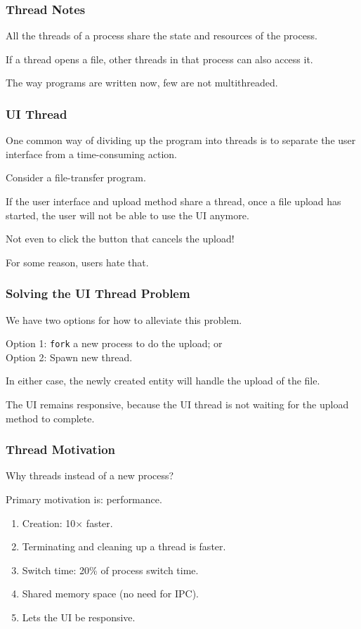 \begin{frame}
\frametitle{Thread Notes}

All the threads of a process share the state and resources of the process. 

If a thread opens a file, other threads in that process can also access it.

The way programs are written now, few are not multithreaded.



\end{frame}

\begin{frame}
\frametitle{UI Thread}

One common way of dividing up the program into threads is to separate the user interface from a time-consuming action. 

Consider a file-transfer program. 

If the user interface and upload method share a thread, once a file upload has started, the user will not be able to use the UI anymore.

Not even to click the button that cancels the upload! 

For some reason, users hate that. 

\end{frame}

\begin{frame}
\frametitle{Solving the UI Thread Problem}

We have two options for how to alleviate this problem.

Option 1: \texttt{fork} a new process to do the upload; or \\
Option 2: Spawn  new thread. 

In either case, the newly created entity will handle the upload of the file. 

The UI remains responsive, because the UI thread is not waiting for the upload method to complete.

\end{frame}

\begin{frame}
\frametitle{Thread Motivation}
Why threads instead of a new process?

Primary motivation is: performance.

\begin{enumerate}
	\item Creation: 10$\times$ faster.
	\item Terminating and cleaning up a thread is faster.
	\item Switch time: 20\% of process switch time.
	\item Shared memory space (no need for IPC).
	\item Lets the UI be responsive.
\end{enumerate}

\end{frame}

